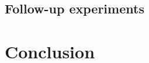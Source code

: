\documentclass[11pt]{article}
\begin{document}
\subsection{Follow-up experiments}\label{sec:foll-up-exper}










\section{Conclusion}\label{sec:conclusion}

\printbibliography[]
\end{document}
